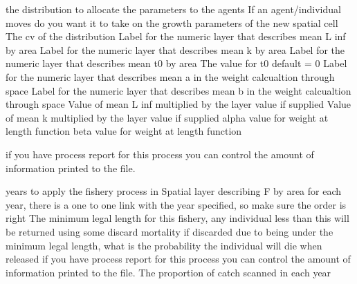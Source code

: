  {}
 {}
\par\textbf{}\par
{} {the distribution to allocate the parameters to the agents}
 {If an agent/individual moves do you want it to take on the growth parameters of the new spatial cell}
 {The cv of the distribution}
 {Label for the numeric layer that describes mean L inf by area}
 {Label for the numeric layer that describes mean k by area}
 {Label for the numeric layer that describes mean t0 by area}
 {The value for t0 default = 0}
 {Label for the numeric layer that describes mean a in the weight calcualtion through space}
 {Label for the numeric layer that describes mean b in the weight calcualtion through space}
 {Value of mean L inf multiplied by the layer value if supplied}
 {Value of mean k multiplied by the layer value if supplied}
 {alpha value for weight at length function}
 {beta value for weight at length function}
 {}
 {}
\par\textbf{}\par
\par\textbf{}\par
{} {if you have process report for this process you can control the amount of information printed to the file.}
\par\textbf{}\par
{} {years to apply the fishery process in}
 {Spatial layer describing F by area for each year, there is a one to one link with the year specified, so make sure the order is right}
 {The minimum legal length for this fishery, any individual less than this will be returned using some discard mortality}
 {if discarded due to being under the minimum legal length, what is the probability the individual will die when released}
 {if you have process report for this process you can control the amount of information printed to the file.}
 {The proportion of catch scanned in each year}
